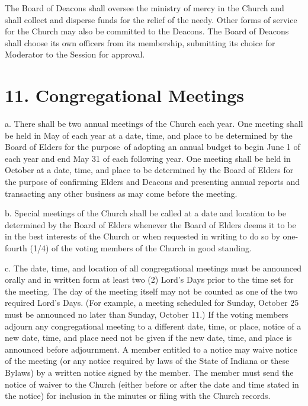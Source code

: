 \documentclass[
]{book}
\begin{document}
The Board of Deacons shall oversee the ministry of mercy in the Church and shall collect and dis­perse funds for the relief of the needy. Other forms of service for the Church may also be commit­ted to the Deacons. The Board of Deacons shall choose its own officers from its membership, submitting its choice for Moderator to the Session for approval.

\hypertarget{congregational-meetings}{%
\section{11. Congregational Meetings}\label{congregational-meetings}}

a. There shall be two annual meetings of the Church each year. One meeting shall be held in May of each year at a date, time, and place to be determined by the Board of Elders for the purpose~of adopting an annual budget to begin June 1 of each year and end May 31 of each following year. One meeting shall be held in October at a date, time, and place to be determined by the Board of Elders for the purpose of confirming Elders and Deacons and presenting annual reports and transacting any other business as may come before the meeting.

b. Special meetings of the Church shall be called at a date and location to be determined by the Board of Elders whenever the Board of Elders deems it to be in the best interests of the Church or when requested in writing to do so by one-fourth (1/4) of the voting members of the Church in good standing.

c. The date, time, and location of all congregational meetings must be announced orally and in written form at least two (2) Lord's Days prior to the time set for the meeting. The day of the meeting itself may not be counted as one of the two required Lord's Days. (For example, a meeting scheduled for Sunday, October 25 must be announced no later than Sunday, October 11.) If the voting members adjourn any congregational meeting to a different date, time, or place, notice of a new date, time, and place need not be given if the new date, time, and place is announced before adjournment. A member entitled to a notice may waive notice of the meeting (or any notice required by laws of the State of Indiana or these Bylaws) by a written notice signed by the member. The member must send the notice of waiver to the Church (either before or after the date and time stated in the notice) for inclusion in the minutes or filing with the Church records.
\end{document}
